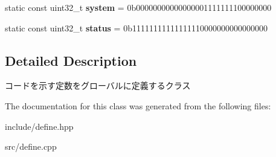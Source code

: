 \begin{DoxyCompactItemize}
\item 
\mbox{\label{classcode_ac739fad4af1af418da76f953a7bba36f}} 
static const uint32\+\_\+t {\bfseries system} = 0b00000000\textquotesingle{}00000000\textquotesingle{}11111111\textquotesingle{}00000000
\item 
\mbox{\label{classcode_a4c50768149c78fc65790055cf94cf6f0}} 
static const uint32\+\_\+t {\bfseries status} = 0b11111111\textquotesingle{}11111111\textquotesingle{}00000000\textquotesingle{}00000000
\end{DoxyCompactItemize}


\subsection{Detailed Description}
コードを示す定数をグローバルに定義するクラス 

The documentation for this class was generated from the following files\+:\begin{DoxyCompactItemize}
\item 
include/define.\+hpp\item 
src/define.\+cpp\end{DoxyCompactItemize}
